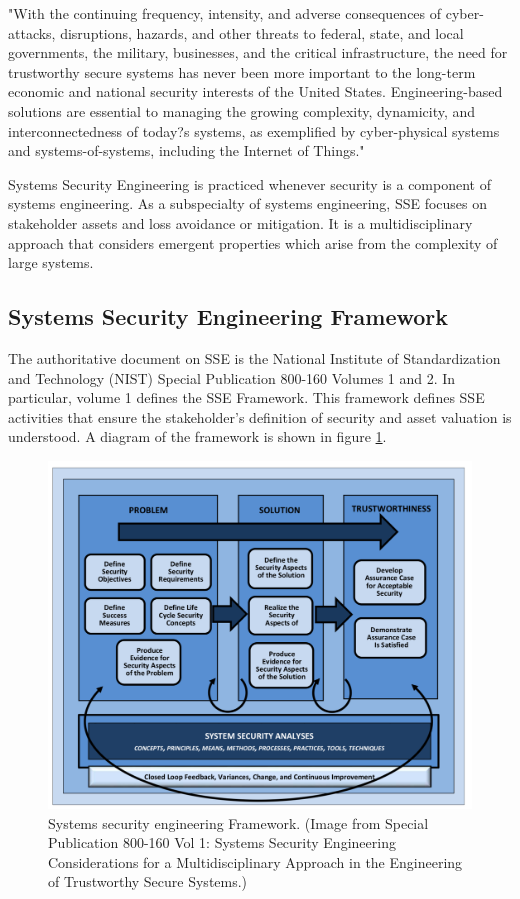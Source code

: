 \documentclass[../../main/main.tex]{subfiles}
\begin{document}
"With the continuing frequency, intensity, and adverse consequences of cyber-attacks, disruptions, hazards, and other threats to federal, state, and local governments, the military, businesses, and the critical infrastructure, the need for trustworthy secure systems has never been more important to the long-term economic and national security interests of the United States. Engineering-based solutions are essential to managing the growing complexity, dynamicity, and interconnectedness of today?s systems, as exemplified by cyber-physical systems and systems-of-systems, including the Internet of Things."

Systems Security Engineering is practiced whenever security is a component of systems engineering.  As a subspecialty of systems engineering, SSE focuses on stakeholder assets and loss avoidance or mitigation.  It is a multidisciplinary approach that considers emergent properties which arise from the complexity of large systems.
   

\subsection{Systems Security Engineering Framework}
The authoritative document on SSE is the National Institute of Standardization and Technology (NIST) Special Publication 800-160 Volumes 1 and 2.  In particular, volume 1 defines the SSE Framework.  This framework defines SSE activities that ensure the stakeholder's definition of security and asset valuation is understood.  A diagram of the framework is shown in figure \ref{sseframework}.

\begin{figure}[h]
\includegraphics[width=\linewidth]{../figures/sseframework}
\caption{\label{sseframework}Systems security engineering Framework. (Image from  Special Publication 800-160 Vol 1: Systems Security Engineering Considerations for a Multidisciplinary Approach in the Engineering of Trustworthy Secure Systems.)}
\end{figure}
\end{document}
